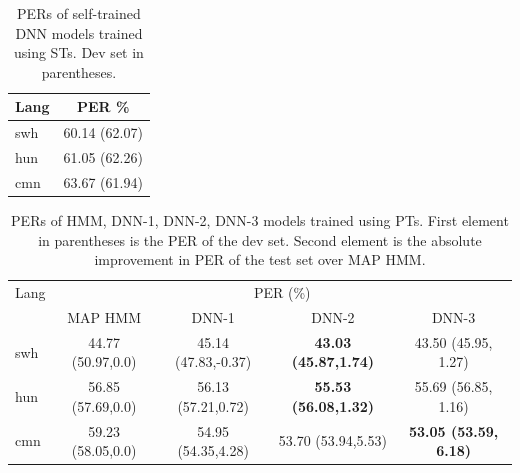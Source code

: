 \documentclass[a4paper]{article}
\begin{document}
\begin{table}[t!]
\centering %
\caption{PERs of self-trained DNN models trained using STs. Dev set in parentheses.}
\vspace{-3mm}
\begin{tabular}{l|c }
   \hline
Lang  & \multicolumn{1}{c}{PER \%} \\ \hline
swh   &  60.14 (62.07)  \\
hun   &  61.05 (62.26) \\
cmn   &  63.67 (61.94)  \\ \hline
\end{tabular}
\vspace{-6mm}
\label{Tab:PER_ASRPT_DNN_monosoftmax}
\end{table}

\begin{table}[t]
\centering %
\caption{PERs of HMM, DNN-1, DNN-2, DNN-3 models trained using PTs. First element in parentheses is the PER of the dev set. Second element is the absolute improvement in PER of the test set over MAP HMM.}
\vspace{-3mm}
\begin{tabular}{l|c c c c}
   \hline
Lang  & \multicolumn{4}{c}{PER (\%)} \\
        &MAP HMM       	   &DNN-1         		&DNN-2          &DNN-3                \\ \hline
swh      &44.77 (50.97,0.0) &45.14 (47.83,-0.37) &\bf{43.03 (45.87,1.74)}   &43.50 (45.95, 1.27)     \\
hun      &56.85 (57.69,0.0) &56.13 (57.21,0.72)  &\bf{55.53  (56.08,1.32)}  &55.69 (56.85, 1.16)     \\ 
cmn      &59.23 (58.05,0.0) &54.95 (54.35,4.28)  &53.70  (53.94,5.53)  &\bf{53.05 (53.59, 6.18)}     \\ \hline
\end{tabular}
\vspace{-5mm}
\label{Tab:PER_PT}
\end{table}
\end{document}
